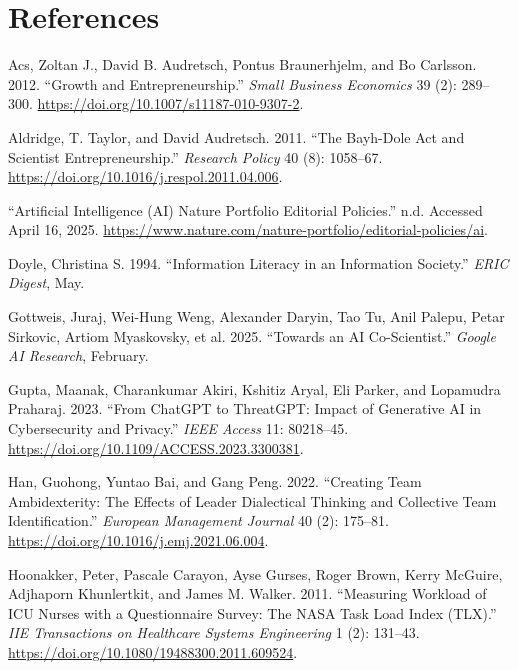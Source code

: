 \documentclass[
]{article}
\newlength{\cslhangindent}
\newenvironment{CSLReferences}[2] %
 {\begin{list}{}{%
  \setlength{\itemindent}{0pt}
  \setlength{\leftmargin}{0pt}
  \setlength{\parsep}{0pt}
  \ifodd #1
   \setlength{\leftmargin}{\cslhangindent}
   \setlength{\itemindent}{-1\cslhangindent}
  \fi
  \setlength{\itemsep}{#2\baselineskip}}}
 {\end{list}}
\begin{document}
\section*{References}\label{references}

\label{refs}
\begin{CSLReferences}{1}{0}
Acs, Zoltan J., David B. Audretsch, Pontus Braunerhjelm, and Bo
Carlsson. 2012. {``Growth and Entrepreneurship.''} \emph{Small Business
Economics} 39 (2): 289--300.
\url{https://doi.org/10.1007/s11187-010-9307-2}.

Aldridge, T. Taylor, and David Audretsch. 2011. {``The Bayh-Dole Act and
Scientist Entrepreneurship.''} \emph{Research Policy} 40 (8): 1058--67.
\url{https://doi.org/10.1016/j.respol.2011.04.006}.

{``Artificial Intelligence ({AI}) {\textbar} Nature Portfolio Editorial
Policies.''} n.d. Accessed April 16, 2025.
\url{https://www.nature.com/nature-portfolio/editorial-policies/ai}.

Doyle, Christina S. 1994. {``Information Literacy in an Information
Society.''} \emph{{ERIC} Digest}, May.

Gottweis, Juraj, Wei-Hung Weng, Alexander Daryin, Tao Tu, Anil Palepu,
Petar Sirkovic, Artiom Myaskovsky, et al. 2025. {``Towards an {AI}
Co-Scientist.''} \emph{Google {AI} Research}, February.

Gupta, Maanak, Charankumar Akiri, Kshitiz Aryal, Eli Parker, and
Lopamudra Praharaj. 2023. {``From {ChatGPT} to {ThreatGPT}: Impact of
Generative {AI} in Cybersecurity and Privacy.''} \emph{{IEEE} Access}
11: 80218--45. \url{https://doi.org/10.1109/ACCESS.2023.3300381}.

Han, Guohong, Yuntao Bai, and Gang Peng. 2022. {``Creating Team
Ambidexterity: The Effects of Leader Dialectical Thinking and Collective
Team Identification.''} \emph{European Management Journal} 40 (2):
175--81. \url{https://doi.org/10.1016/j.emj.2021.06.004}.

Hoonakker, Peter, Pascale Carayon, Ayse Gurses, Roger Brown, Kerry
McGuire, Adjhaporn Khunlertkit, and James M. Walker. 2011. {``Measuring
Workload of {ICU} Nurses with a Questionnaire Survey: The {NASA} Task
Load Index ({TLX}).''} \emph{{IIE} Transactions on Healthcare Systems
Engineering} 1 (2): 131--43.
\url{https://doi.org/10.1080/19488300.2011.609524}.


\end{CSLReferences}
\end{document}
